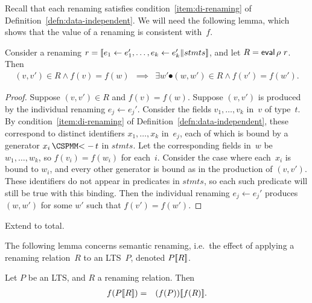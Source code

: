 
Recall that each renaming satisfies condition~\ref{item:di-renaming} of
Definition~\ref{defn:data-independent}.  We will need the following lemma,
which shows that the value of a renaming is consistent with~$f$.
%
\begin{lemma}
\label{lem:renaming-invariant}
Consider a renaming $r = {[\![} e_1 \leftarrow e_1', \ldots, e_k
  \leftarrow e_k' \| stmts{]\!]}$, and let $R = \mathop{\sf eval} \rho~ r$.  Then
%
\begin{eqnarray*}
(v,v') \in R \land f(v) = f(w) & \implies &
  \exists w' \spot (w,w') \in R \land f(v') = f(w').
\end{eqnarray*}
\end{lemma}


\begin{proof}
Suppose $(v,v') \in R$ and $f(v) = f(w)$.  Suppose $(v,v')$ is produced by the
individual renaming $e_j \leftarrow e_j'$.  Consider the fields
$v_1,\ldots,v_k$ in~$v$ of type~$t$.  By condition~\ref{item:di-renaming} of
Definition~\ref{defn:data-independent}, these correspond to distinct
identifiers $x_1,\ldots,x_k$ in~$e_j$, each of which is bound by a generator
$x_i \,\M{<-}\, t$ in $stmts$.  Let the corresponding fields in~$w$ be
$w_1,\ldots,w_k$, so $f(v_i) = f(w_i)$ for each~$i$.
%
Consider the case where each~$x_i$ is bound to $w_i$, and every other
generator is bound as in the production of $(v,v')$.  These identifiers do not
appear in predicates in $stmts$, so each such predicate will still be true
with this binding.  Then the individual renaming $e_j \leftarrow e_j'$
produces $(w,w')$ for some $w'$ such that $f(v') = f(w')$.
\end{proof}


  Extend to total. 

The following lemma concerns semantic renaming, i.e.~the effect of applying a
renaming relation~$R$ to an LTS~$P$, denoted $P{[\![}R{]\!]}$.  
%
\begin{lemma}
\label{lem:renaming-f}
Let $P$ be an LTS, and $R$ a renaming relation.  Then
%
\begin{eqnarray*}
f(P{[\![}R{]\!]}) & = & (f(P)){[\![}f(R){]\!]}.
\end{eqnarray*}
%
\end{lemma}

